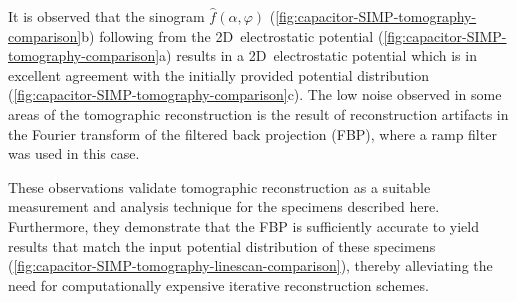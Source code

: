 It is observed that the sinogram $\hat{f}\left(\alpha, \varphi\right)$ (\cref{fig:capacitor-SIMP-tomography-comparison}b) following from the 2D~electrostatic potential (\cref{fig:capacitor-SIMP-tomography-comparison}a) results in a 2D~electrostatic potential which is in excellent agreement with the initially provided potential distribution (\cref{fig:capacitor-SIMP-tomography-comparison}c). The low noise observed in some areas of the tomographic reconstruction is the result of reconstruction artifacts in the Fourier transform of the filtered back projection (FBP), where a ramp filter was used in this case.

These observations validate tomographic reconstruction as a suitable measurement and analysis technique for the specimens described here. Furthermore, they demonstrate that the FBP is sufficiently accurate to yield results that match the input potential distribution of these specimens (\cref{fig:capacitor-SIMP-tomography-linescan-comparison}), thereby alleviating the need for computationally expensive iterative reconstruction schemes.

